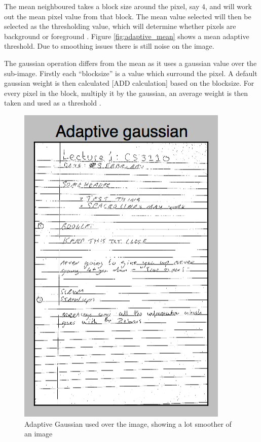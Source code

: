 The mean neighboured takes a block size around the pixel, say 4, and will work out the mean pixel value from that block. The mean value selected will then be selected as the thresholding value, which will determine whether pixels are background or foreground \cite{citeulike:14021401}. Figure \ref{fig:adaptive_mean} shows a mean adaptive threshold. Due to smoothing issues there is still noise on the image.

The gaussian operation differs from the mean as it uses a gaussian value over the sub-image. Firstly each ``blocksize'' is a value which surround the pixel. A default gaussian weight is then calculated [ADD calculation] based on the blocksize. For every pixel in the block, multiply it by the gaussian, an average weight is then taken and used as a threshold \cite{bradski2008learning}\cite{citeulike:1402140}.


\begin{figure}[H]
  \centering
  \includegraphics{images/adaptive_gaussian}
  \caption{Adaptive Gaussian used over the image, showing a lot smoother of an image}
  \label{fig:adaptive_gaussian}
\end{figure}

